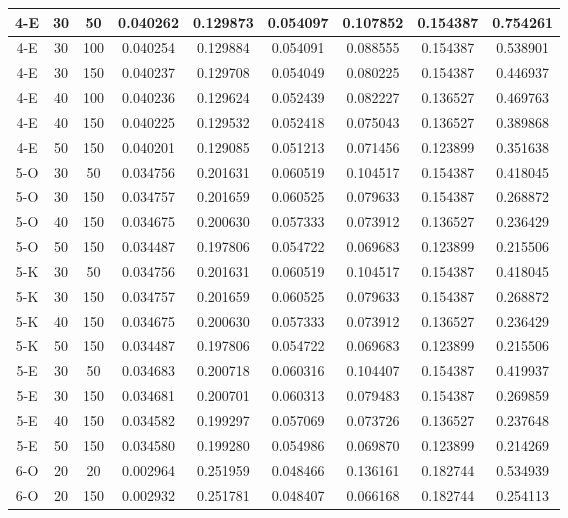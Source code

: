 \begin{center}
\begin{longtable}{|c|c|c|c|c|c|c|c|c|}
	\hline 4-E &	30 &	50	&	0.040262 &	0.129873 &	0.054097 &	0.107852 &	0.154387 &	0.754261 \\
	\hline 4-E &	30 &	100	&	0.040254 &	0.129884 &	0.054091 &	0.088555 &	0.154387 &	0.538901 \\
	\hline 4-E &	30 &	150	&	0.040237 &	0.129708 &	0.054049 &	0.080225 &	0.154387 &	0.446937 \\
	\hline 4-E &	40 &	100	&	0.040236 &	0.129624 &	0.052439 &	0.082227 &	0.136527 &	0.469763 \\
	\hline 4-E &	40 &	150	&	0.040225 &	0.129532 &	0.052418 &	0.075043 &	0.136527 &	0.389868 \\
	\hline \rowcolor{acceptable} 4-E &	50 &	150	&	0.040201 &	0.129085 &	0.051213 &	0.071456 &	0.123899 &	0.351638 \\
	\hline 5-O &	30 &	50	&	0.034756 &	0.201631 &	0.060519 &	0.104517 &	0.154387 &	0.418045 \\
	\hline 5-O &	30 &	150	&	0.034757 &	0.201659 &	0.060525 &	0.079633 &	0.154387 &	0.268872 \\
	\hline 5-O &	40 &	150	&	0.034675 &	0.200630 &	0.057333 &	0.073912 &	0.136527 &	0.236429 \\
	\hline 5-O &	50 &	150	&	0.034487 &	0.197806 &	0.054722 &	0.069683 &	0.123899 &	0.215506 \\
	\hline 5-K &	30 &	50	&	0.034756 &	0.201631 &	0.060519 &	0.104517 &	0.154387 &	0.418045 \\
	\hline 5-K &	30 &	150	&	0.034757 &	0.201659 &	0.060525 &	0.079633 &	0.154387 &	0.268872 \\
	\hline 5-K &	40 &	150	&	0.034675 &	0.200630 &	0.057333 &	0.073912 &	0.136527 &	0.236429 \\
	\hline 5-K &	50 &	150	&	0.034487 &	0.197806 &	0.054722 &	0.069683 &	0.123899 &	0.215506 \\
	\hline 5-E &	30 &	50	&	0.034683 &	0.200718 &	0.060316 &	0.104407 &	0.154387 &	0.419937 \\
	\hline 5-E &	30 &	150	&	0.034681 &	0.200701 &	0.060313 &	0.079483 &	0.154387 &	0.269859 \\
	\hline 5-E &	40 &	150	&	0.034582 &	0.199297 &	0.057069 &	0.073726 &	0.136527 &	0.237648 \\
	\hline 5-E &	50 &	150	&	0.034580 &	0.199280 &	0.054986 &	0.069870 &	0.123899 &	0.214269 \\
	\hline 6-O &	20 &	20	&	0.002964 &	0.251959 &	0.048466 &	0.136161 &	0.182744 &	0.534939 \\
	\hline 6-O &	20 &	150	&	0.002932 &	0.251781 &	0.048407 &	0.066168 &	0.182744 &	0.254113 \\

\end{longtable}
\end{center}
